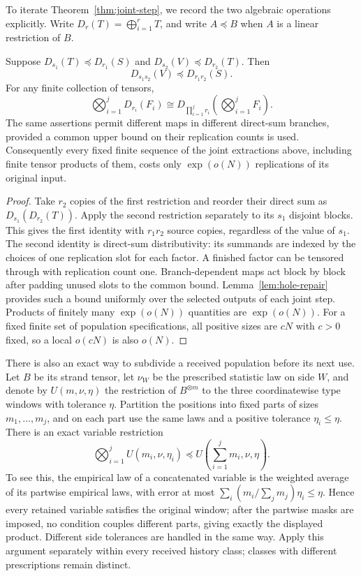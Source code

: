 To iterate Theorem~\ref{thm:joint-step}, we record the two algebraic
operations explicitly.  Write $D_r(T)=\bigoplus_{i=1}^r T$,
and write $A\preceq B$ when $A$ is a linear restriction of $B$.

\begin{lemma}
\label{lem:replication}
Suppose $D_{s_1}(T)\preceq D_{r_1}(S)$ and
$D_{s_2}(V)\preceq D_{r_2}(T)$.  Then
\[
 D_{s_1s_2}(V)\preceq D_{r_1r_2}(S).
\]
For any finite collection of tensors,
\[
 \bigotimes_{i=1}^j D_{r_i}(F_i)
 \cong D_{\prod_{i=1}^j r_i}\left(\bigotimes_{i=1}^jF_i\right).
\]
The same assertions permit different maps in different direct-sum
branches, provided a common upper bound on their replication counts
is used.  Consequently every fixed finite sequence of the joint
extractions above, including finite tensor products of them, costs
only $\exp(o(N))$ replications of its original input.
\end{lemma}

\begin{proof}
Take $r_2$ copies of the first restriction and reorder their direct
sum as $D_{s_1}(D_{r_2}(T))$.  Apply the second restriction separately
to its $s_1$ disjoint blocks.  This gives the first identity with
$r_1r_2$ source copies, regardless of the value of $s_1$.
The second identity is direct-sum distributivity: its summands are
indexed by the choices of one replication slot for each factor.
A finished factor can be tensored through with replication count one.
Branch-dependent maps act block by block after padding unused slots
to the common bound.  Lemma~\ref{lem:hole-repair} provides such a
bound uniformly over the selected outputs of each joint step.
Products of finitely many $\exp(o(N))$ quantities are $\exp(o(N))$.
For a fixed finite set of population specifications, all positive
sizes are $cN$ with $c>0$ fixed, so a local $o(cN)$ is also $o(N)$.
\end{proof}

There is also an exact way to subdivide a received population before
its next use.  Let $B$ be its strand tensor, let $\nu_W$ be the
prescribed statistic law on side $W$, and denote by
$U(m,\nu,\eta)$ the restriction of $B^{\otimes m}$ to the three
coordinatewise type windows with tolerance $\eta$.  Partition the
positions into fixed parts of sizes $m_1,\ldots,m_j$, and on each part
use the same laws and a positive tolerance $\eta_i\leq\eta$.  There is an exact
variable restriction
\begin{equation}
 \bigotimes_{i=1}^j U(m_i,\nu,\eta_i)
 \preceq U\left(\sum_{i=1}^j m_i,\nu,\eta\right).
 \label{eq:subdivision-restriction}
\end{equation}
To see this, the empirical law of a concatenated variable is the
weighted average of its partwise empirical laws, with error at most
$\sum_i(m_i/\sum_jm_j)\eta_i\leq\eta$.  Hence every retained
variable satisfies the original window; after the partwise masks are
imposed, no condition couples different parts, giving exactly the
displayed product.  Different side tolerances are handled in the same
way.  Apply this argument separately within every received history
class; classes with different prescriptions remain distinct.

